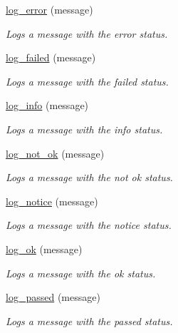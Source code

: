 \begin{DoxyCompactItemize}
\hyperlink{group__log_gaf7fc980e941ae8915356cd89ccac471d}{log\+\_\+error} (message)
\begin{DoxyCompactList}\small\item\em Logs a message with the \textquotesingle{}error\textquotesingle{} status. \end{DoxyCompactList}\item 
\hyperlink{group__log_ga0cb03f40aca4c3da6097aa2578c828ad}{log\+\_\+failed} (message)
\begin{DoxyCompactList}\small\item\em Logs a message with the \textquotesingle{}failed\textquotesingle{} status. \end{DoxyCompactList}\item 
\hyperlink{group__log_ga92ca4a8206896c4a61c287683582defa}{log\+\_\+info} (message)
\begin{DoxyCompactList}\small\item\em Logs a message with the \textquotesingle{}info\textquotesingle{} status. \end{DoxyCompactList}\item 
\hyperlink{group__log_gae751dcb14187d5a6df81d879bf8fc943}{log\+\_\+not\+\_\+ok} (message)
\begin{DoxyCompactList}\small\item\em Logs a message with the \textquotesingle{}not ok\textquotesingle{} status. \end{DoxyCompactList}\item 
\hyperlink{group__log_ga09a7d78f794ff2cc825e3cf0f4bb6b84}{log\+\_\+notice} (message)
\begin{DoxyCompactList}\small\item\em Logs a message with the \textquotesingle{}notice\textquotesingle{} status. \end{DoxyCompactList}\item 
\hyperlink{group__log_ga7568aef6b2176c077d4feb5c85ab1444}{log\+\_\+ok} (message)
\begin{DoxyCompactList}\small\item\em Logs a message with the \textquotesingle{}ok\textquotesingle{} status. \end{DoxyCompactList}\item 
\hyperlink{group__log_ga074798b609f0b5076100e00dc9ca8321}{log\+\_\+passed} (message)
\begin{DoxyCompactList}\small\item\em Logs a message with the \textquotesingle{}passed\textquotesingle{} status. \end{DoxyCompactList}\item 

\end{DoxyCompactItemize}
